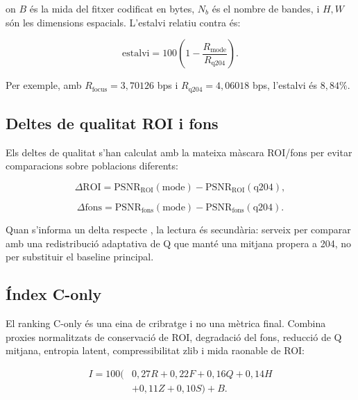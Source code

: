 on $B$ és la mida del fitxer codificat en bytes, $N_b$ és el nombre de bandes,
i $H,W$ són les dimensions espacials. L'estalvi relatiu contra  és:

\begin{equation}
\mathrm{estalvi} =
100\left(1-\frac{R_{\mathrm{mode}}}{R_{\mathrm{q204}}}\right).
\end{equation}

Per exemple, amb $R_{\mathrm{focus}}=3,70126$ bps i
$R_{\mathrm{q204}}=4,06018$ bps, l'estalvi és $8,84\%$.

\subsection{Deltes de qualitat ROI i fons}

Els deltes de qualitat s'han calculat amb la mateixa màscara ROI/fons per evitar
comparacions sobre poblacions diferents:

\begin{equation}
\Delta \mathrm{ROI} =
\mathrm{PSNR}_{\mathrm{ROI}}(\mathrm{mode}) -
\mathrm{PSNR}_{\mathrm{ROI}}(\mathrm{q204}),
\end{equation}

\begin{equation}
\Delta \mathrm{fons} =
\mathrm{PSNR}_{\mathrm{fons}}(\mathrm{mode}) -
\mathrm{PSNR}_{\mathrm{fons}}(\mathrm{q204}).
\end{equation}

Quan s'informa un delta respecte , la lectura és secundària:
serveix per comparar  amb una redistribució adaptativa de Q
que manté una mitjana propera a 204, no per substituir el baseline principal.

\subsection{Índex C-only}

El ranking C-only és una eina de cribratge i no una mètrica final. Combina
proxies normalitzats de conservació de ROI, degradació del fons, reducció de Q
mitjana, entropia latent, compressibilitat zlib i mida raonable de ROI:

\begin{equation}
\begin{aligned}
I = 100(&0,27R + 0,22F + 0,16Q + 0,14H \\
       &+ 0,11Z + 0,10S) + B.
\end{aligned}
\end{equation}

